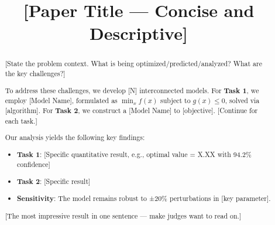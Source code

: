 \documentclass{mcmthesis}
\title{[Paper Title — Concise and Descriptive]}
\begin{document}
\begin{abstract}

[State the problem context. What is being optimized/predicted/analyzed?
What are the key challenges?]

To address these challenges, we develop [N] interconnected models.
For \textbf{Task 1}, we employ [Model Name], formulated as
$\min_{x} f(x)$ subject to $g(x) \leq 0$, solved via [algorithm].
For \textbf{Task 2}, we construct a [Model Name] to [objective].
[Continue for each task.]

Our analysis yields the following key findings:
\begin{itemize}[nosep]
    \item \textbf{Task 1}: [Specific quantitative result, e.g., optimal value = X.XX with 94.2\% confidence]
    \item \textbf{Task 2}: [Specific result]
    \item \textbf{Sensitivity}: The model remains robust to ±20\% perturbations in [key parameter].
\end{itemize}

[The most impressive result in one sentence — make judges want to read on.]

\end{abstract}

\keywords{[keyword1]; [keyword2]; [keyword3]; [keyword4]; [keyword5]}

\maketitle

\setcounter{tocdepth}{2}
\tableofcontents
\newpage
\end{document}
